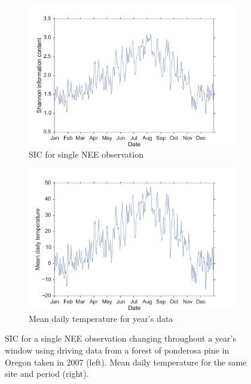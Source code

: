 \begin{figure}[ht]
    \centering
    \begin{subfigure}[b]{0.45\textwidth}
        \includegraphics[width=\textwidth]{chapter/chapter5/oregon2007SICnee.pdf}
        \caption{SIC for single NEE observation}
        \label{chap5:fig:sic_nee_oregon2007}
    \end{subfigure}%
    \begin{subfigure}[b]{0.45\textwidth}
        \includegraphics[width=\textwidth]{chapter/chapter5/oregon2007temp.pdf}
        \caption{Mean daily temperature for year's data}
        \label{chap5:fig:temp_nee_oregon2007}
    \end{subfigure}
    \caption{SIC for a single NEE observation changing throughout a year's window using driving data from a forest of ponderosa pine in Oregon taken in 2007 (left). Mean daily temperature for the same site and period (right).}
    \label{chap5:fig:neeSIC_temp_comp}
\end{figure}

